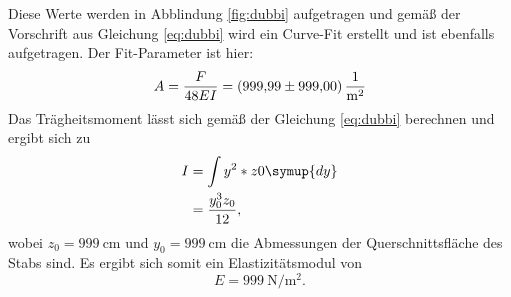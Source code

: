 \noindent Diese Werte werden in Abblindung \ref{fig:dubbi} aufgetragen und gemäß der Vorschrift aus Gleichung \eqref{eq:dubbi}
wird ein Curve-Fit erstellt und ist ebenfalls aufgetragen.
Der Fit-Parameter ist hier:
\begin{equation}
    A = \frac{F}{48EI} = \SI{999.99\pm999}{\per\meter\squared}
\end{equation}
Das Trägheitsmoment lässt sich gemäß der Gleichung \eqref{eq:dubbi} berechnen und ergibt sich zu
\begin{align}
    I &= \int y^2*z0 \symup{dy} \\
      &= \frac{y_0^3z_0}{12},
\end{align}
wobei $z_0=\SI{999}{\centi\meter}$ und $y_0=\SI{999}{\centi\meter}$ die Abmessungen der Querschnittsfläche des Stabs sind.
Es ergibt sich somit ein Elastizitätsmodul von
\begin{equation}
    E = \SI{999}{\newton\per\meter\squared}.
\end{equation}
